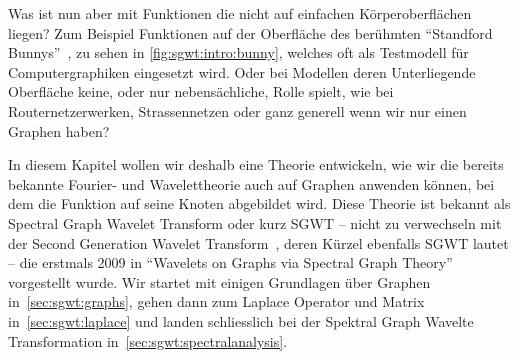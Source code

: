 Was ist nun aber mit Funktionen die nicht auf einfachen K\"orperoberfl\"achen 
liegen? Zum Beispiel Funktionen auf der Oberfl\"ache des ber\"uhmten 
``Standford Bunnys''~\cite{noauthor_stanford_nodate}, zu sehen in 
\cref{fig:sgwt:intro:bunny}, welches oft als Testmodell f\"ur Computergraphiken 
eingesetzt wird. Oder bei Modellen deren Unterliegende Oberfl\"ache keine, 
oder nur nebens\"achliche, Rolle spielt, wie bei Routernetzerwerken, 
Strassennetzen oder ganz generell wenn wir nur einen Graphen haben?

In diesem Kapitel wollen wir deshalb eine Theorie entwickeln, wie 
wir die bereits bekannte Fourier- und Wavelettheorie auch auf Graphen anwenden 
k\"onnen, bei dem die Funktion auf seine Knoten abgebildet wird. Diese Theorie 
ist bekannt als Spectral Graph Wavelet Transform oder kurz SGWT -- nicht zu 
verwechseln mit der Second Generation Wavelet 
Transform~\cite{noauthor_second-generation_2018}, deren K\"urzel ebenfalls SGWT 
lautet -- die erstmals 2009 in ``Wavelets on Graphs via Spectral Graph 
Theory''~\cite{hammond_wavelets_2009} vorgestellt wurde. Wir startet mit 
einigen Grundlagen \"uber Graphen in~\cref{sec:sgwt:graphs}, gehen dann zum 
Laplace Operator und Matrix in~\cref{sec:sgwt:laplace} 
und landen schliesslich bei der Spektral Graph Wavelte Transformation 
in~\cref{sec:sgwt:spectralanalysis}.
